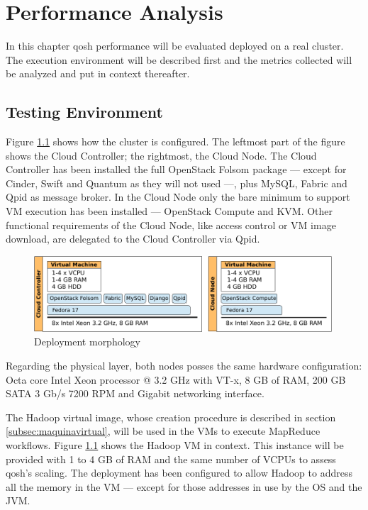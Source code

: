 \chapter{Performance Analysis}\label{cap:rendimiento}
\noindent In this chapter qosh performance will be evaluated deployed on a real cluster. The execution environment will be described first and the metrics collected will be analyzed and put in context thereafter.

\section{Testing Environment}\label{sec:entornodeprueba}
\noindent Figure \ref{fig:clusterdespliegue} shows how the cluster is configured. The leftmost part of the figure shows the Cloud Controller; the rightmost, the Cloud Node. The Cloud Controller has been installed the full OpenStack Folsom package --- except for Cinder, Swift and Quantum as they will not used ---, plus MySQL, Fabric and Qpid as message broker. In the Cloud Node only the bare minimum to support VM execution has been installed --- OpenStack Compute and KVM. Other functional requirements of the Cloud Node, like access control or VM image download, are delegated to the Cloud Controller via Qpid.

\begin{figure}[tbp]
\begin{center}
\includegraphics[width=0.99\textwidth]{imagenes/038.pdf}
 \caption{Deployment morphology}
\label{fig:clusterdespliegue}
\end{center}
\end{figure}

Regarding the physical layer, both nodes posses the same hardware configuration: Octa core Intel Xeon processor @ 3.2 GHz with VT-x, 8 GB of RAM, 200 GB SATA 3 Gb/s 7200 RPM and Gigabit networking interface.

The Hadoop virtual image, whose creation procedure is described in section \ref{subsec:maquinavirtual}, will be used in the VMs to execute MapReduce workflows. Figure \ref{fig:clusterdespliegue} shows the Hadoop VM in context. This instance will be  provided with 1 to 4 GB of RAM and the same number of VCPUs to assess qosh's scaling. The deployment has been configured to allow Hadoop to address all the memory in the VM --- except for those addresses in use by the OS and the JVM.

